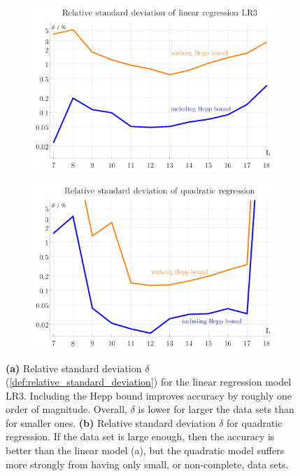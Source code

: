 \documentclass[12pt]{article}
\numberwithin{equation}{section}
\begin{document}
\begin{figure}[htb]
	
	\begin{subfigure}{ .49 \linewidth}
		\centering
		\includegraphics[width=\linewidth]{figures/LR3_delta}
		\subcaption{}
		\label{fig:LR3_delta}
	\end{subfigure}
	\begin{subfigure}{ .49 \linewidth}
		\centering
		\includegraphics[width=\linewidth]{figures/QR_delta}
		\subcaption{}
		\label{fig:QR_delta}
	\end{subfigure}
	\caption{ 
		\textbf{(a)}  Relative standard deviation $\delta$ (\cref{def:relative_standard_deviation}) for the linear regression model LR3. Including the Hepp bound improves accuracy by roughly one order of magnitude. Overall, $\delta$ is lower for larger the data sets than for smaller ones. 
		\textbf{(b)} Relative standard deviation $\delta$ for quadratic regression. If the data set is large enough, then the accuracy is   better than the linear model (a), but the quadratic model suffers more strongly from having only small, or non-complete, data sets. }
	\label{fig:regression}
\end{figure}
\end{document}
